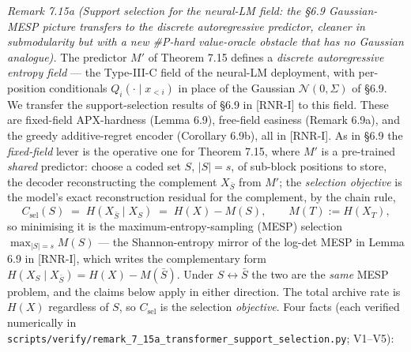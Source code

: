 \documentclass[
]{article}
\begin{document}
\emph{Remark 7.15a (Support selection for the neural-LM field: the §6.9
Gaussian-MESP picture transfers to the discrete autoregressive predictor,
cleaner in submodularity but with a new \#P-hard value-oracle obstacle that
has no Gaussian analogue).} The predictor $M'$ of Theorem 7.15 defines a
\emph{discrete autoregressive entropy field} --- the Type-III-C field of the
neural-LM deployment, with per-position conditionals
$Q_i(\cdot\mid x_{<i})$ in place of the Gaussian $\mathcal N(0,\Sigma)$ of
§6.9. We transfer the support-selection results of §6.9 in [RNR-I]
to this field. These are fixed-field APX-hardness (Lemma 6.9),
free-field easiness (Remark 6.9a), and the greedy additive-regret
encoder (Corollary 6.9b), all in [RNR-I]. As in §6.9 the
\emph{fixed-field} lever is the operative one for Theorem 7.15, where $M'$
is a pre-trained \emph{shared} predictor: choose a coded set $S$, $|S|=s$,
of sub-block positions to store, the decoder reconstructing the complement
$X_{\bar S}$ from $M'$; the \emph{selection objective} is the model's exact
reconstruction residual for the complement, by the chain rule,
\[
C_{\mathrm{sel}}(S) \;=\; H(X_{\bar S}\mid X_S)
\;=\; H(X) - M(S), \qquad M(T):=H(X_T),
\]
so minimising it is the maximum-entropy-sampling (MESP) selection
$\max_{|S|=s} M(S)$ --- the Shannon-entropy mirror of the log-det MESP
in Lemma 6.9 in [RNR-I], which writes the complementary form
$H(X_S\mid X_{\bar S})=H(X)-M(\bar S)$. Under $S\leftrightarrow\bar S$
the two are the \emph{same} MESP problem, and the claims below apply in
either direction. The total archive rate is $H(X)$ regardless of $S$,
so $C_{\mathrm{sel}}$ is the selection \emph{objective}. Four facts (each
verified numerically in
\texttt{scripts/verify/remark\_7\_15a\_transformer\_support\_selection.py};
V1--V5):
\end{document}
